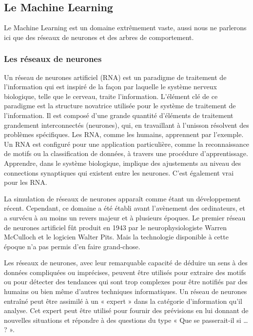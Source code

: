 \documentclass[a4paper, 12pt]{article} %
\begin{document}
\subsection{Le Machine Learning}

Le Machine Learning est un domaine extrêmement vaste, aussi nous ne parlerons ici que des réseaux de neurones et des arbres de comportement.

\subsubsection{Les réseaux de neurones}

Un réseau de neurones artificiel (RNA)\cite{rna} est un paradigme de traitement de l’information qui est inspiré de la façon par laquelle le système nerveux biologique, telle que le cerveau, traite l’information. L’élément clé de ce paradigme est la structure novatrice utilisée pour le système de traitement de l’information. Il est composé d’une grande quantité d’éléments de traitement grandement interconnectés (neurones), qui, en travaillant à l’unisson résolvent des problèmes spécifiques. Les RNA, comme les humains, apprennent par l’exemple. Un RNA est configuré pour une application particulière, comme la reconnaissance de motifs ou la classification de données, à travers une procédure d’apprentissage. Apprendre, dans le système biologique, implique des ajustements au niveau des connections synaptiques qui existent entre les neurones. C’est également vrai pour les RNA.

La simulation de réseaux de neurones apparaît comme étant un développement récent. Cependant, ce domaine a été établi avant l’avènement des ordinateurs, et a survécu à au moins un revers majeur et à plusieurs époques. Le premier réseau de neurones artificiel fût produit en 1943 par le neurophysiologiste Warren McCulloch et le logicien Walter Pits. Mais la technologie disponible à cette époque n’a pas permis d’en faire grand-chose.

\newpage
Les réseaux de neurones, avec leur remarquable capacité de déduire un sens à des données compliquées ou imprécises, peuvent être utilisés pour extraire des motifs ou pour détecter des tendances qui sont trop complexes pour être notifiés par des humains ou bien même d’autres techniques informatiques. Un réseau de neurones entraîné peut être assimilé à un « expert » dans la catégorie d’information qu’il analyse. Cet expert peut être utilisé pour fournir des prévisions en lui donnant de nouvelles situations et répondre à des questions du type « Que se passerait-il si … ? ».
\end{document}
